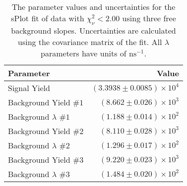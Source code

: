 
\begin{table}[ht]
    \begin{center}
        \begin{tabular}{lr}\toprule
            Parameter & Value \\\midrule
            Signal Yield & $(3.3938 \pm 0.0085) \times 10^{4}$ \\
            Background Yield $\#1$ & $(8.662 \pm 0.026) \times 10^{3}$ \\
            Background $\lambda$ $\#1$ & $(1.188 \pm 0.014) \times 10^{2}$ \\
            Background Yield $\#2$ & $(8.110 \pm 0.028) \times 10^{3}$ \\
            Background $\lambda$ $\#2$ & $(1.296 \pm 0.017) \times 10^{2}$ \\
            Background Yield $\#3$ & $(9.220 \pm 0.023) \times 10^{3}$ \\
            Background $\lambda$ $\#3$ & $(1.484 \pm 0.020) \times 10^{2}$ \\\bottomrule
        \end{tabular}
        \caption{The parameter values and uncertainties for the sPlot fit of data with $\chi^2_\nu < 2.00$ using three free background slopes. Uncertainties are calculated using the covariance matrix of the fit. All $\lambda$ parameters have units of $\si{\nano\second}^{-1}$.}\label{tab:splot-fit-results-chisqdof-2.00-free-3}
    \end{center}
\end{table}
